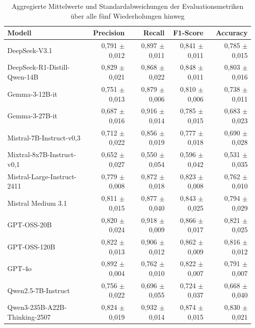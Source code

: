 \begin{table}[htbp]
    \centering
    \caption{Aggregierte Mittelwerte und Standardabweichungen der Evaluationsmetriken über alle fünf Wiederholungen hinweg}
    \label{tab:metrics-overview}
    \begin{adjustbox}{width=\textwidth}
        \begin{tabular}{l r r r r}
            \toprule
            Modell                          & Precision         & Recall            & F1-Score          & Accuracy \\
            \midrule
            DeepSeek-V3.1                   & 0,791 $\pm$ 0,012 & 0,897 $\pm$ 0,011 & 0,841 $\pm$ 0,011 & 0,785 $\pm$ 0,015 \\
            DeepSeek-R1-Distill-Qwen-14B    & 0,829 $\pm$ 0,021 & 0,868 $\pm$ 0,022 & 0,848 $\pm$ 0,011 & 0,803 $\pm$ 0,016 \\
            Gemma-3-12B-it                  & 0,751 $\pm$ 0,013 & 0,879 $\pm$ 0,006 & 0,810 $\pm$ 0,006 & 0,738 $\pm$ 0,011 \\
            Gemma-3-27B-it                  & 0,687 $\pm$ 0,016 & 0,916 $\pm$ 0,014 & 0,785 $\pm$ 0,015 & 0,683 $\pm$ 0,023 \\
            Mistral-7B-Instruct-v0,3        & 0,712 $\pm$ 0,022 & 0,856 $\pm$ 0,019 & 0,777 $\pm$ 0,018 & 0,690 $\pm$ 0,028 \\
            Mixtral-8x7B-Instruct-v0,1      & 0,652 $\pm$ 0,027 & 0,550 $\pm$ 0,054 & 0,596 $\pm$ 0,042 & 0,531 $\pm$ 0,035 \\
            Mistral-Large-Instruct-2411     & 0,779 $\pm$ 0,008 & 0,872 $\pm$ 0,018 & 0,823 $\pm$ 0,008 & 0,762 $\pm$ 0,010 \\
            Mistral Medium 3.1              & 0,811 $\pm$ 0,015 & 0,877 $\pm$ 0,040 & 0,843 $\pm$ 0,025 & 0,794 $\pm$ 0,029 \\
            GPT-OSS-20B                     & 0,820 $\pm$ 0,024 & 0,918 $\pm$ 0,009 & 0,866 $\pm$ 0,017 & 0,821 $\pm$ 0,025 \\
            GPT-OSS-120B                    & 0,822 $\pm$ 0,013 & 0,906 $\pm$ 0,012 & 0,862 $\pm$ 0,009 & 0,816 $\pm$ 0,012 \\
            GPT-4o                          & 0,892 $\pm$ 0,004 & 0,762 $\pm$ 0,010 & 0,822 $\pm$ 0,007 & 0,791 $\pm$ 0,007 \\
            Qwen2.5-7B-Instruct             & 0,756 $\pm$ 0,022 & 0,696 $\pm$ 0,055 & 0,724 $\pm$ 0,037 & 0,668 $\pm$ 0,040 \\
            Qwen3-235B-A22B-Thinking-2507   & 0,824 $\pm$ 0,019 & 0,932 $\pm$ 0,014 & 0,874 $\pm$ 0,015 & 0,830 $\pm$ 0,021 \\
            \bottomrule
        \end{tabular}
    \end{adjustbox}
\end{table}

